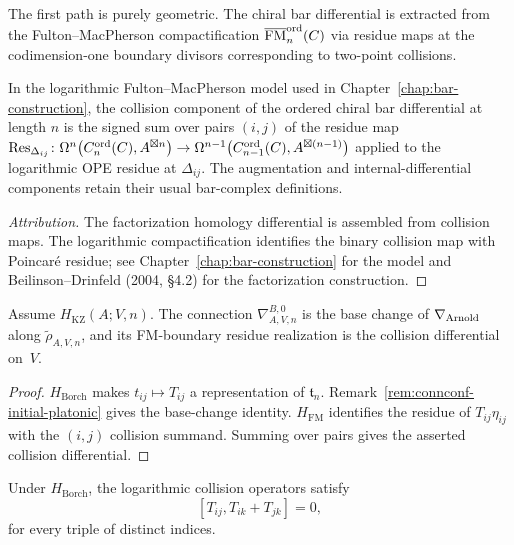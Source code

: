 The first path is purely geometric. The chiral bar differential is
extracted from the Fulton--MacPherson compactification
$\overline{\mathrm{FM}}_n^{\mathrm{ord}}(C)$ via residue maps at
the codimension-one boundary divisors corresponding to two-point
collisions.

\begin{lemma}
\label{lem:fm-residue-dbar-platonic}
\ClaimStatusConditional
In the logarithmic Fulton--MacPherson model used in
Chapter~\ref{chap:bar-construction}, the collision component of the
ordered chiral bar differential at length $n$ is the signed sum over
pairs $(i,j)$ of the residue map
$\operatorname{Res}_{\Delta_{ij}} \colon \Omega^{n}\bigl(C_n^{\mathrm{ord}}(C), A^{\boxtimes n}\bigr)
\to \Omega^{n-1}\bigl(C_{n-1}^{\mathrm{ord}}(C), A^{\boxtimes(n-1)}\bigr)$
applied to the logarithmic OPE residue at $\Delta_{ij}$.  The
augmentation and internal-differential components retain their usual
bar-complex definitions.
\end{lemma}

\begin{proof}[Attribution]
The factorization homology differential is assembled from collision
maps.  The logarithmic compactification identifies the binary
collision map with Poincar\'e residue; see
Chapter~\ref{chap:bar-construction} for the model and
Beilinson--Drinfeld (2004, \S4.2) for the factorization construction.
\end{proof}

\begin{lemma}
\label{lem:pullback-presentation-nabla-platonic}
\ClaimStatusConditional
Assume $H_{\mathrm{KZ}}(A;V,n)$.  The connection
$\nabla^{B,0}_{A,V,n}$ is the base change of $\nabla_{\mathrm{Arnold}}$ along
$\widetilde\rho_{A,V,n}$, and its FM-boundary residue realization is
the collision differential on~$V$.
\end{lemma}

\begin{proof}
$H_{\mathrm{Borch}}$ makes
$t_{ij}\mapsto T_{ij}$ a representation of $\mathfrak t_n$.
Remark~\ref{rem:connconf-initial-platonic} gives the base-change
identity.  $H_{\mathrm{FM}}$ identifies the residue of
$T_{ij}\eta_{ij}$ with the $(i,j)$ collision summand.  Summing over
pairs gives the asserted collision differential.
\end{proof}

\begin{lemma}
\label{lem:triple-collision-cybe-platonic}
Under $H_{\mathrm{Borch}}$, the logarithmic collision operators satisfy
\begin{equation}
\label{eq:cybe-on-r}
 [T_{ij},T_{ik}+T_{jk}]=0,
\end{equation}
for every triple of distinct indices.
\end{lemma}

